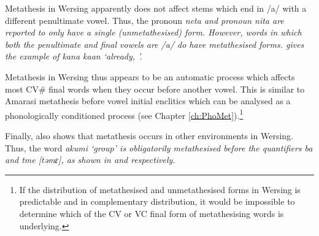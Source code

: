 Metathesis in Wersing apparently does not affect stems
which end in /a/ with a different penultimate vowel.
Thus, the  pronoun \it{neta}
and \tsc{1px} pronoun \it{nita} are reported to only
have a single (unmetathesised) form.
However, words in which both the penultimate and final
vowels are /a/ do have metathesised forms.
\cite{ba18} gives the example of \it{kana} {\ra} \it{kaan} `already, '.

Metathesis in Wersing thus appears to be an automatic
process which affects most CV{\#} final words
when they occur before another vowel.
This is similar to Amarasi metathesis before vowel initial enclitics
which can be analysed as a phonologically
conditioned process (see Chapter \ref{ch:PhoMet}).\footnote{
		If the distribution of metathesised and unmetathesised
		forms in Wersing is predictable and in complementary distribution,
		it would be impossible to determine which of the CV or VC
		final form of metathesising words is underlying.}

Finally, \cite{ba18} also shows that metathesis
occurs in other environments in Wersing.
Thus, the word \it{akumi} `group' 
is obligatorily metathesised before the quantifiers \it{ba} and \it{tme} [təmɛ],
as shown in  and  respectively.

\begin{multicols}{2}
\let\eachwordone=\it
	\begin{exe}
		\label{ex:akuim1}
	\end{exe}
\end{multicols}
\begin{multicols}{2}
\let\eachwordone=\it
	\begin{exe}		
		\label{ex:akuim2}
	\end{exe}
\end{multicols}

